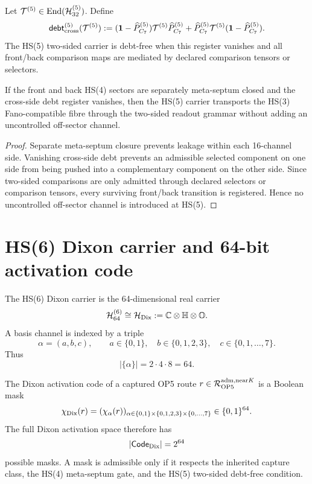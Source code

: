\begin{definition}
Let \(\mathcal T^{(5)}\in\operatorname{End}(\mathcal H^{(5)}_{32})\). Define
\[
\mathsf{debt}_{\mathrm{cross}}^{(5)}(\mathcal T^{(5)})
:=
(\mathbf 1-\widehat P_{C_7}^{(5)})\mathcal T^{(5)}\widehat P_{C_7}^{(5)}
+
\widehat P_{C_7}^{(5)}\mathcal T^{(5)}(\mathbf 1-\widehat P_{C_7}^{(5)}).
\]
The HS(5) two-sided carrier is debt-free when this register vanishes and all front/back comparison maps are mediated by declared comparison tensors or selectors.
\end{definition}

\begin{proposition}
If the front and back HS(4) sectors are separately meta-septum closed and the cross-side debt register vanishes, then the HS(5) carrier transports the HS(3) Fano-compatible fibre through the two-sided readout grammar without adding an uncontrolled off-sector channel.
\end{proposition}

\begin{proof}
Separate meta-septum closure prevents leakage within each 16-channel side. Vanishing cross-side debt prevents an admissible selected component on one side from being pushed into a complementary component on the other side. Since two-sided comparisons are only admitted through declared selectors or comparison tensors, every surviving front/back transition is registered. Hence no uncontrolled off-sector channel is introduced at HS(5).
\end{proof}

\section{HS(6) Dixon carrier and 64-bit activation code}

\begin{definition}
The HS(6) Dixon carrier is the 64-dimensional real carrier
\[
\mathcal H^{(6)}_{64}
\cong
\mathcal H_{\mathrm{Dix}}
:=
\mathbb C\otimes\mathbb H\otimes\mathbb O.
\]
A basis channel is indexed by a triple
\[
\alpha=(a,b,c),
\qquad
 a\in\{0,1\},\quad b\in\{0,1,2,3\},\quad c\in\{0,1,\ldots,7\}.
\]
Thus
\[
|\{\alpha\}|=2\cdot4\cdot8=64.
\]
\end{definition}

\begin{definition}
The Dixon activation code of a captured OP5 route \(r\in\mathcal R_{\mathrm{OP} 5}^{\mathrm{adm},\mathrm{near} K}\) is a Boolean mask
\[
\chi_{\mathrm{Dix}}(r)
=
(\chi_{\alpha}(r))_{\alpha\in\{0,1\}\times\{0,1,2,3\}\times\{0,\ldots,7\}}
\in
\{0,1\}^{64}.
\]
The full Dixon activation space therefore has
\[
|\mathsf{Code}_{\mathrm{Dix}}|=2^{64}
\]
possible masks. A mask is admissible only if it respects the inherited capture class, the HS(4) meta-septum gate, and the HS(5) two-sided debt-free condition.
\end{definition}

